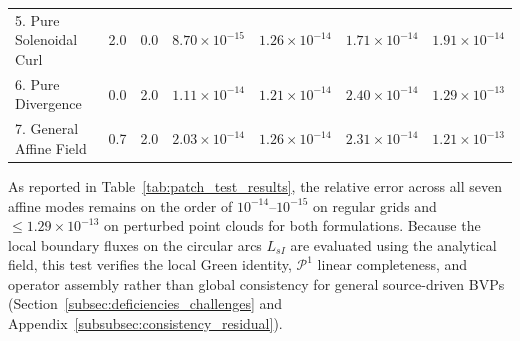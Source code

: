 \documentclass[VANCOUVER]{USG}
\begin{document}
\begin{table}[!t]
{\begin{tabular}{lcccccc}
            5. Pure Solenoidal Curl    & 2.0                                      & 0.0                                 & $8.70 \times 10^{-15}$                                     & $1.26 \times 10^{-14}$                                     & $1.71 \times 10^{-14}$ & $1.91 \times 10^{-14}$ \\
            6. Pure Divergence         & 0.0                                      & 2.0                                 & $1.11 \times 10^{-14}$                                     & $1.21 \times 10^{-14}$                                     & $2.40 \times 10^{-14}$ & $1.29 \times 10^{-13}$ \\
            7. General Affine Field    & 0.7                                      & 2.0                                 & $2.03 \times 10^{-14}$                                     & $1.26 \times 10^{-14}$                                     & $2.31 \times 10^{-14}$ & $1.21 \times 10^{-13}$ \\
            \bottomrule
        \end{tabular}
    }
\end{table}

As reported in Table~\ref{tab:patch_test_results}, the relative error across all seven affine modes remains on the order of $10^{-14}\text{--}10^{-15}$ on regular grids and $\le 1.29 \times 10^{-13}$ on perturbed point clouds for both formulations. Because the local boundary fluxes on the circular arcs $L_{sI}$ are evaluated using the analytical field, this test verifies the local Green identity, $\mathcal{P}^1$ linear completeness, and operator assembly rather than global consistency for general source-driven BVPs (Section~\ref{subsec:deficiencies_challenges} and Appendix~\ref{subsubsec:consistency_residual}).
\end{document}
